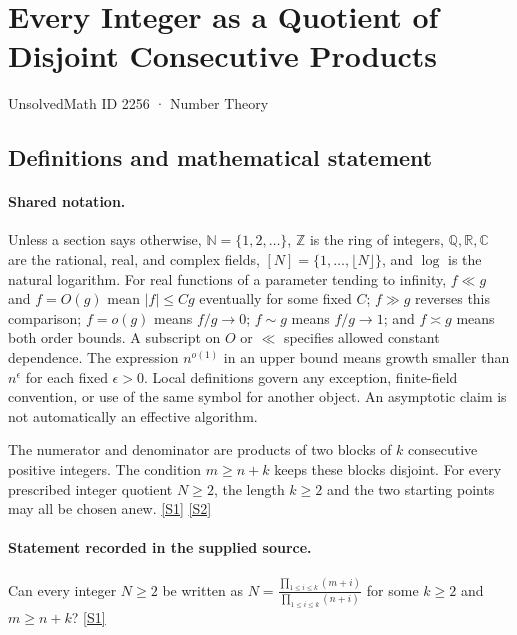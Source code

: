 \documentclass[11pt,a4paper]{article}
\newcommand{\N}{\mathbb{N}}
\newcommand{\Z}{\mathbb{Z}}
\newcommand{\Q}{\mathbb{Q}}
\newcommand{\R}{\mathbb{R}}
\newcommand{\C}{\mathbb{C}}
\newcommand{\sref}[2]{\hyperlink{source:#1:#2}{[S#2]}}
\begin{document}

\setcounter{section}{2255}

\section{Every Integer as a Quotient of Disjoint Consecutive Products}\label{2256}

{\small\sffamily UnsolvedMath ID 2256 · Number Theory}

\subsection{Definitions and mathematical statement}

\paragraph{Shared notation.}Unless a section says otherwise, $\N=\{1,2,\ldots\}$,
$\Z$ is the ring of integers, $\Q,\R,\C$ are the rational, real, and complex
fields, $[N]=\{1,\ldots,\lfloor N\rfloor\}$, and $\log$ is the natural
logarithm. For real functions of a parameter tending to infinity,
$f\ll g$ and $f=O(g)$ mean $|f|\leq Cg$ eventually for some fixed $C$;
$f\gg g$ reverses this comparison; $f=o(g)$ means $f/g\to0$;
$f\sim g$ means $f/g\to1$; and $f\asymp g$ means both order bounds.
A subscript on $O$ or $\ll$ specifies allowed constant dependence.
The expression $n^{o(1)}$ in an upper bound means growth smaller than
$n^\epsilon$ for each fixed $\epsilon>0$. Local definitions govern any
exception, finite-field convention, or use of the same symbol for another
object. An asymptotic claim is not automatically an effective algorithm.



The numerator and denominator are products of two blocks of $k$ consecutive positive integers. The condition $m\geq n+k$ keeps these blocks disjoint. For every prescribed integer quotient $N\geq2$, the length $k\geq2$ and the two starting points may all be chosen anew. \sref{2256}{1} \sref{2256}{2}

\paragraph{Statement recorded in the supplied source.}
Can every integer $N\geq 2$ be written as $ N=\frac{\prod_{1\leq i\leq k}(m+i)}{\prod_{1\leq i\leq k}(n+i)} $ for some $k\geq 2$ and $m\geq n+k$? \sref{2256}{1}
\end{document}
